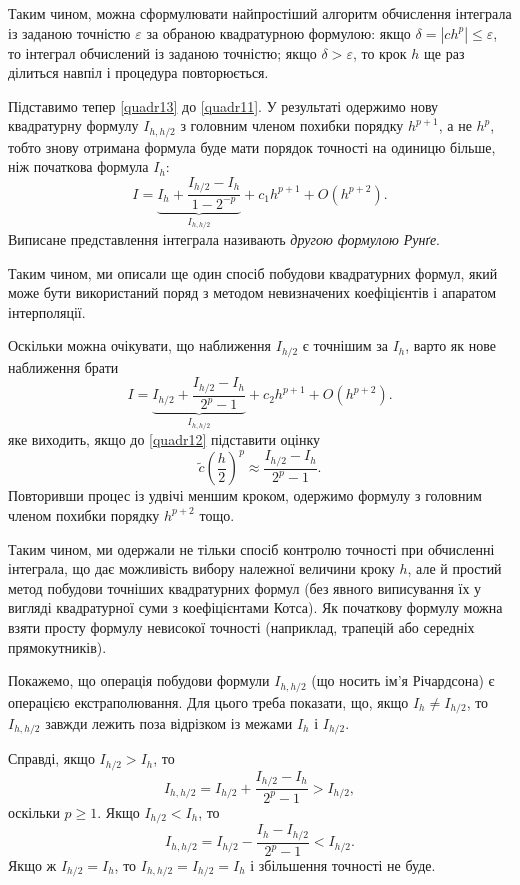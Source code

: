 \documentclass[14pt,twoside]{extreport}
\theoremstyle{mystyle}
\numberwithin{equation}{chapter}
\begin{document}
Таким чином, можна сформулювати найпростіший алгоритм обчислення інтеграла із заданою точністю $\varepsilon$ за обраною квадратурною формулою: якщо $\delta = |ch^p| \leqslant \varepsilon$, то інтеграл
обчислений із заданою точністю; якщо $\delta > \varepsilon$, то крок $h$ ще раз ділиться навпіл і процедура повторюється.

Підставимо тепер \eqref{quadr13} до \eqref{quadr11}. У результаті одержимо нову квадратурну формулу $I_{h,h/2}$ з головним членом похибки порядку $h^{p+1}$, а не $h^{p}$, тобто знову отримана формула буде
мати порядок точності на одиницю більше, ніж початкова формула $I_h$:
\[
I=\underbrace{I_h + \dfrac{I_{h/2}-I_h}{1-2^{-p}}}_{I_{h,h/2}} + c_1 h^{p+1} + O\left(h^{p+2}\right).
\]
Виписане представлення інтеграла називають \emph{другою формулою Рунґе}.

Таким чином, ми описали ще один спосіб побудови квадратурних формул, який може бути використаний поряд з методом невизначених коефіцієнтів і апаратом інтерполяції.

Оскільки можна очікувати, що наближення $I_{h/2}$ є точнішим за $I_h$, варто як нове наближення брати
\begin{equation}\label{quadr14}
I=\underbrace{I_{h/2} + \dfrac{I_{h/2}-I_h}{2^{p}-1}}_{I_{h,h/2}} + c_2 h^{p+1} + O\left(h^{p+2}\right).
\end{equation}
яке виходить, якщо до \eqref{quadr12} підставити оцінку
\[
\tilde{c}\left(\frac{h}{2}\right)^{p}\approx\frac{I_{h/2}-I_{h}}{2^{p}-1}.
\]
Повторивши процес із удвічі меншим кроком, одержимо формулу з головним членом похибки порядку $h^{p+2}$ тощо.

Таким чином, ми одержали не тільки спосіб контролю точності при обчисленні інтеграла, що дає можливість вибору належної величини кроку $h$, але й простий метод побудови точніших квадратурних формул (без явного виписування їх у вигляді квадратурної суми з коефіцієнтами Котса). Як початкову формулу можна взяти просту формулу невисокої точності (наприклад, трапецій або середніх прямокутників).

Покажемо, що операція побудови формули $I_{h,h/2}$ (що носить ім'я Річардсона) є операцією екстраполювання. Для цього треба показати, що, якщо $I_h \neq I_{h/2}$, то $I_{h,h/2}$ завжди лежить поза відрізком із межами $I_h$ і $I_{h/2}$.

Справді, якщо $I_{h/2} > I_h$, то
\[
I_{h,h/2}=I_{h/2}+\frac{I_{h/2}-I_{h}}{2^{p}-1}>I_{h/2},
\]
оскільки $p \geqslant 1$. Якщо $I_{h/2} < I_h$, то
\[
I_{h,h/2}=I_{h/2}-\frac{I_{h}-I_{h/2}}{2^{p}-1}<I_{h/2}.
\]
Якщо ж $I_{h/2} = I_h$, то $I_{h,h/2} = I_{h/2} = I_h$ і збільшення точності не буде.
\end{document}
